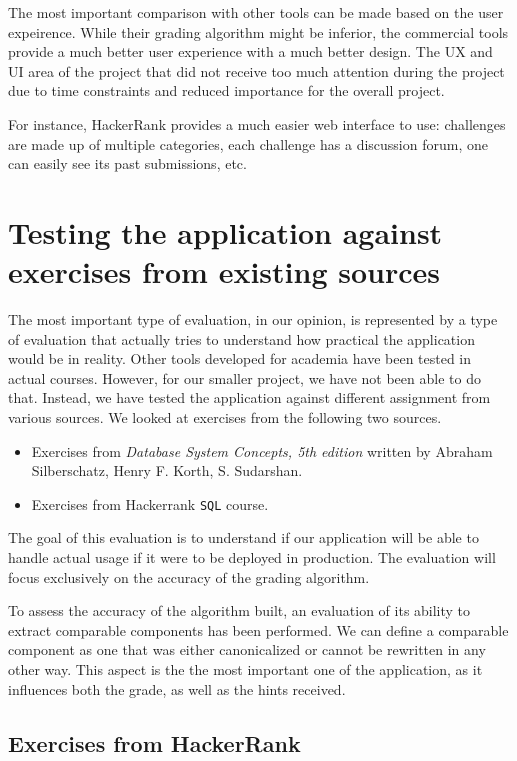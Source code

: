 The most important comparison with other tools can be made based on the user expeirence. While their grading algorithm might be inferior, the commercial tools provide a much better user experience with a much better design. The UX and UI area of the project that did not receive too much attention during the project due to time constraints and reduced importance for the overall project.

For instance, HackerRank provides a much easier web interface to use: challenges are made up of multiple categories, each challenge has a discussion forum, one can easily see its past submissions, etc.


\section{Testing the application against exercises from existing sources}

The most important type of evaluation, in our opinion, is represented by a type of evaluation that actually tries to understand how practical the application would be in reality. Other tools developed for academia have been tested in actual courses. However, for our smaller project, we have not been able to do that. Instead, we have tested the application against different assignment from various sources. We looked at exercises from the following two sources.

\begin{itemize}
    \item Exercises from \textit{Database System Concepts, 5th edition} written by Abraham Silberschatz, Henry F. Korth, S. Sudarshan.
    \item Exercises from Hackerrank \texttt{SQL} course.
\end{itemize}

The goal of this evaluation is to understand if our application will be able to handle actual usage if it were to be deployed in production. The evaluation will focus exclusively on the accuracy of the grading algorithm.


To assess the accuracy of the algorithm built, an evaluation of its ability to extract comparable components has been performed. We can define  a comparable component as one that was either canonicalized or cannot be rewritten in any other way. This aspect is the the most important one of the application, as it influences both the grade, as well as the hints received.

\subsection{Exercises from HackerRank}

